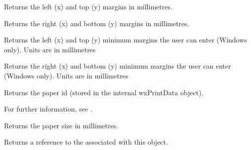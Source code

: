 \label{wxpagesetupdialogdatagetmargintopleft}


Returns the left (x) and top (y) margins in millimetres.

\label{wxpagesetupdialogdatagetmarginbottomright}


Returns the right (x) and bottom (y) margins in millimetres.

\label{wxpagesetupdialogdatagetminmargintopleft}


Returns the left (x) and top (y) minimum margins the user can enter (Windows only). Units
are in millimetres

\label{wxpagesetupdialogdatagetminmarginbottomright}


Returns the right (x) and bottom (y) minimum margins the user can enter (Windows only). Units
are in millimetres

\label{wxpagesetupdialogdatagetpaperid}


Returns the paper id (stored in the internal wxPrintData object).

For further information, see .

\label{wxpagesetupdialogdatagetpapersize}


Returns the paper size in millimetres.

\label{wxpagesetupdialogdatagetprintdata}


Returns a reference to the  associated with this object.

\label{wxpagesetupdialogdataisok}

